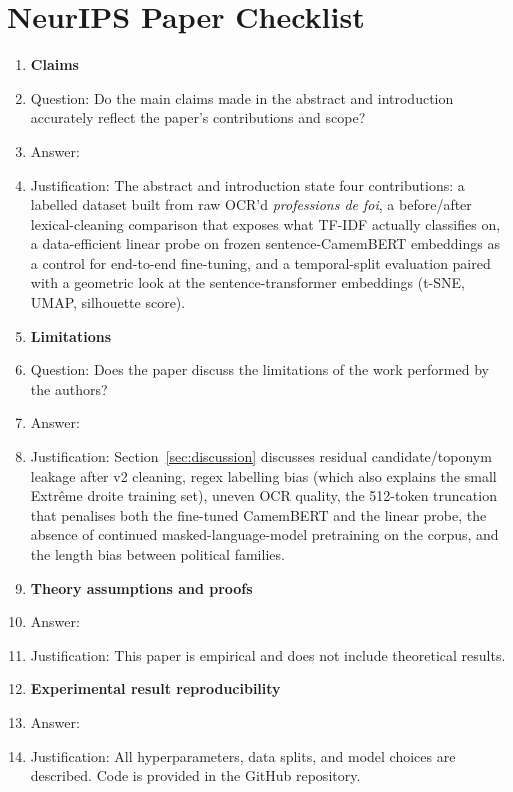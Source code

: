 \section*{NeurIPS Paper Checklist}

\begin{enumerate}

\item {\bf Claims}
    \item[] Question: Do the main claims made in the abstract and introduction accurately reflect the paper's contributions and scope?
    \item[] Answer: \answerYes{}
    \item[] Justification: The abstract and introduction state four contributions: a labelled dataset built from raw OCR'd \textit{professions de foi}, a before/after lexical-cleaning comparison that exposes what TF-IDF actually classifies on, a data-efficient linear probe on frozen sentence-CamemBERT embeddings as a control for end-to-end fine-tuning, and a temporal-split evaluation paired with a geometric look at the sentence-transformer embeddings (t-SNE, UMAP, silhouette score).

\item {\bf Limitations}
    \item[] Question: Does the paper discuss the limitations of the work performed by the authors?
    \item[] Answer: \answerYes{}
    \item[] Justification: Section~\ref{sec:discussion} discusses residual candidate/toponym leakage after v2 cleaning, regex labelling bias (which also explains the small Extr\^{e}me droite training set), uneven OCR quality, the 512-token truncation that penalises both the fine-tuned CamemBERT and the linear probe, the absence of continued masked-language-model pretraining on the corpus, and the length bias between political families.

\item {\bf Theory assumptions and proofs}
    \item[] Answer: \answerNA{}
    \item[] Justification: This paper is empirical and does not include theoretical results.

\item {\bf Experimental result reproducibility}
    \item[] Answer: \answerYes{}
    \item[] Justification: All hyperparameters, data splits, and model choices are described. Code is provided in the GitHub repository.


\end{enumerate}

